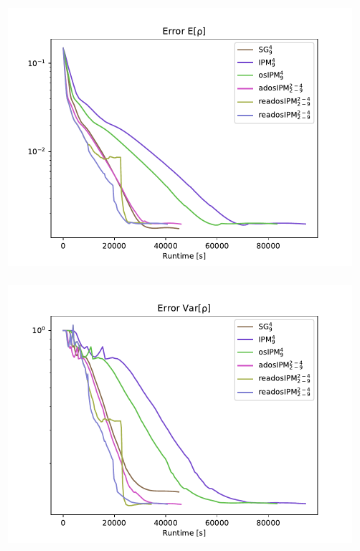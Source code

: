 \begin{figure}[h!]
\centering
	\begin{subfigure}{0.5\linewidth}
		\centering
				\includegraphics[scale=0.55]{figs/errorEuler/L2_error_E[rho].pdf}
		\label{fig:sub31}
		\caption{}
	\end{subfigure}%
	\begin{subfigure}{0.5\linewidth}
		\centering
				\includegraphics[scale=0.55]{figs/errorEuler/L2_error_Var[rho].pdf}
		\label{fig:sub32}
		\caption{}
	\end{subfigure}
	

\end{figure}
